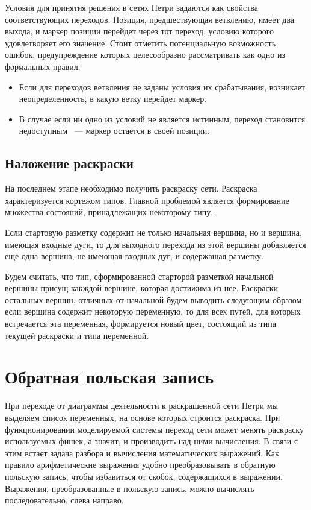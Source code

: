 Условия для принятия решения в сетях Петри задаются как свойства соответствующих переходов. Позиция, предшествующая ветвлению, имеет два выхода, и маркер позиции перейдет через тот переход, условию которого удовлетворяет его значение. Стоит отметить потенциальную возможность ошибок, предупреждение которых целесообразно рассматривать как одно из формальных правил.
\begin{itemize}
\item Если для переходов ветвления не заданы условия их срабатывания, возникает неопределенность, в какую ветку перейдет маркер.
\item В случае если ни одно из условий не является истинным, переход становится недоступным ~--- маркер остается в своей позиции.
\end{itemize}

\subsection{Наложение раскраски}

На последнем этапе необходимо получить раскраску сети. Раскраска характеризуется кортежом типов. Главной проблемой является формирование множества состояний, принадлежащих некоторому типу.

Если стартовую разметку содержит не только начальная вершина, но и вершина, имеющая входные дуги, то для выходного перехода из этой вершины добавляется еще одна вершина, не имеющая входных дуг, и содержащая разметку.

Будем считать, что тип, сформированной старторой разметкой начальной вершины присущ какждой вершине, которая достижима из нее. Раскраски остальных вершин, отличных от начальной будем выводить следующим образом: если вершина содержит некоторую переменную, то для всех путей, для которых встречается эта переменная, формируется новый цвет, состоящий из типа текущей раскраски и типа переменной.

\section{Обратная польская запись}

При переходе от диаграммы деятельности к раскрашенной сети Петри мы выделяем список переменных, на основе которых строится раскраска. При функционировании моделируемой системы переход сети может менять раскраску используемых фишек, а значит, и производить над ними вычисления. В связи с этим встает задача разбора и вычисления математических выражений. Как правило арифметические выражения удобно преобразовывать в обратную польскую запись, чтобы избавиться от скобок, содержащихся в выражении. Выражения, преобразованные в польскую запись, можно вычислять последовательно, слева направо.

